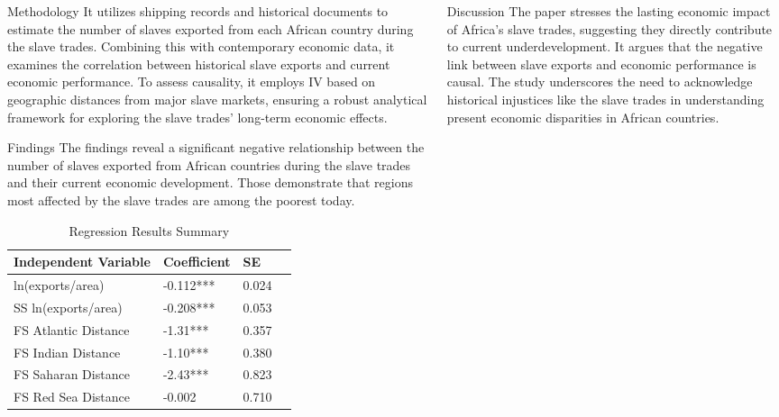 \documentclass[final]{beamer}
\begin{document}
\begin{frame}[t]
\begin{columns}[T]
\begin{column}{.32\textwidth}
    \begin{block}{\Huge Methodology} %
    \Large %
    It utilizes shipping records and historical documents to estimate the number of slaves exported from each African country during the slave trades. Combining this with contemporary economic data, it examines the correlation between historical slave exports and current economic performance. To assess causality, it employs IV based on geographic distances from major slave markets, ensuring a robust analytical framework for exploring the slave trades' long-term economic effects.
    \end{block}

    \vspace{1cm} %

    \begin{block}{\Huge Findings} %
    \Large %
    The findings reveal a significant negative relationship between the number of slaves exported from African countries during the slave trades and their current economic development. Those demonstrate that regions most affected by the slave trades are among the poorest today. 

    \begin{table}[H]
\centering
\caption{Regression Results Summary}
\begin{tabular}{llll}
\toprule
Independent Variable & Coefficient & SE  \\
\midrule
ln(exports/area)& -0.112*** & 0.024 \\
SS ln(exports/area) & -0.208*** & 0.053 \\
FS Atlantic Distance & -1.31*** & 0.357 \\
FS Indian Distance & -1.10*** & 0.380 \\
FS Saharan Distance & -2.43*** & 0.823 \\
FS Red Sea Distance & -0.002 & 0.710 \\
\hline
\bottomrule
\end{tabular}
\end{table}
    
    \end{block}
\end{column}

\begin{column}{.32\textwidth}
    \begin{block}{\Huge Discussion} %
    \Large %
    The paper stresses the lasting economic impact of Africa's slave trades, suggesting they directly contribute to current underdevelopment. It argues that the negative link between slave exports and economic performance is causal. The study underscores the need to acknowledge historical injustices like the slave trades in understanding present economic disparities in African countries.
    \end{block}


\end{column}
\end{columns}
\end{frame}
\end{document}
